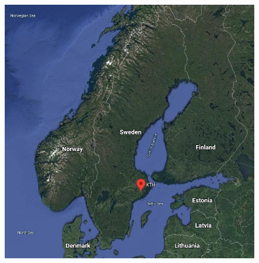 \begin{frame}
\begin{figure}
{    \includegraphics[height=0.35\textheight]{fig/kth-map.png}}
\end{figure}
\end{frame}
